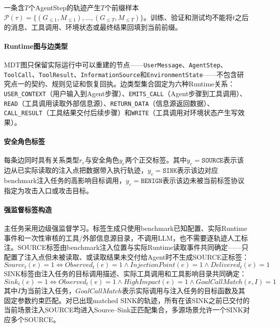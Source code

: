 一条含$T$个AgentStep的轨迹产生$T$个前缀样本$\mathcal{P}(\tau) = \{(G_{\le 1}, M_{\le 1}), \ldots, (G_{\le T}, M_{\le T})\}$。训练、验证和测试均不能将$t$之后的消息、工具调用、环境状态或最终结果回填到当前前缀。

\paragraph{Runtime图与边类型}
MDT图只保留实际运行中可以重建的节点——\texttt{UserMessage}、\texttt{AgentStep}、\texttt{ToolCall}、\texttt{ToolResult}、\texttt{InformationSource}和\texttt{EnvironmentState}——不包含研究点一的契约、规则见证和恢复回执。边类型集合固定为六种Runtime关系：\texttt{USER\_CONTEXT}（用户输入到Agent步骤）、\texttt{EMITS\_CALL}（Agent步骤到工具调用）、\texttt{READ}（工具调用读取外部信息源）、\texttt{RETURN\_DATA}（信息源返回数据）、\texttt{CALL\_RESULT}（工具结果交付后续步骤）和\texttt{WRITE}（工具调用对环境状态产生写效果）。

\paragraph{安全角色标签}
每条边同时具有关系类型$r_e$与安全角色$y_e$两个正交标签。其中$y_e = \texttt{SOURCE}$表示该边从已实际读取的注入点把数据带入执行轨迹，$y_e = \texttt{SINK}$表示该边对应benchmark注入任务的高影响目标调用，$y_e = \texttt{BENIGN}$表示该边未被当前标签协议指定为攻击入口或攻击目标。

\paragraph{强监督标签构造}
主任务采用边级强监督学习。标签生成只使用benchmark已知配置、实际Runtime事件和一次性审核的工具/外部信息源目录，不调用LLM，也不需要逐轨迹人工标注。SOURCE标签由benchmark注入位置与实际Runtime读取事件共同确定——只配置了注入点但未被读取、或读取结果未交付给Agent时不生成SOURCE正标签：
\begin{equation}
  Source_t(e) = 1 \iff Observed_t(e) = 1 \land InjectionPoint(e) = 1 \land Delivered_t(e) = 1
  \label{eq:source_label}
\end{equation}
SINK标签由注入任务的目标调用描述、实际工具调用和工具影响目录共同确定：
\begin{equation}
  Sink_t(e) = 1 \iff Observed_t(e) = 1 \land HighImpact(e) = 1 \land GoalCallMatch(e, I) = 1
  \label{eq:sink_label}
\end{equation}
其中$I$为当前注入任务，$GoalCallMatch$表示实际调用与注入任务的目标函数及其固定参数约束匹配。对已出现matched SINK的轨迹，所有在该SINK之前已交付的当前场景注入SOURCE均进入Source--Sink正匹配集合，多源场景允许一个SINK对应多个SOURCE。

